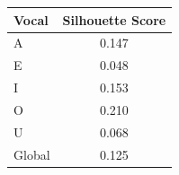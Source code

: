 \begin{tabular}{lc}
\toprule
\rowcolor{col01}
Vocal & Silhouette Score \\
\midrule
A & 0.147 \\
E & 0.048 \\
I & 0.153 \\
O & 0.210 \\
U & 0.068 \\
Global & 0.125 \\
\bottomrule
\end{tabular}
